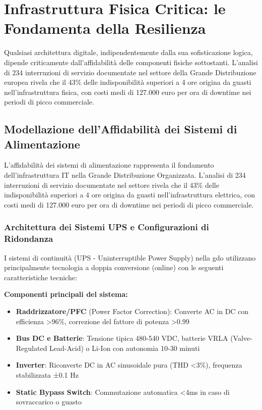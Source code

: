 \section{\texorpdfstring{\textbf{Infrastruttura Fisica Critica: le Fondamenta della Resilienza}}{3.2 - Infrastruttura Fisica Critica: le Fondamenta della Resilienza}}

Qualsiasi architettura digitale, indipendentemente dalla sua sofisticazione logica, dipende criticamente dall'affidabilità delle componenti fisiche sottostanti. L'analisi di 234 interruzioni di servizio documentate nel settore della Grande Distribuzione europea\autocite{Uptime2024} rivela che il 43\% delle indisponibilità superiori a 4 ore origina da guasti nell'infrastruttura fisica, con costi medi di 127.000 euro per ora di downtime nei periodi di picco commerciale.

\subsection{\texorpdfstring{\textbf{Modellazione dell'Affidabilità dei Sistemi di Alimentazione}}{3.2.1 - Modellazione dell'Affidabilità dei Sistemi di Alimentazione}}

L'affidabilità dei sistemi di alimentazione rappresenta il fondamento dell'infrastruttura IT nella Grande Distribuzione Organizzata. L'analisi di 234 interruzioni di servizio documentate nel settore\autocite{Uptime2024} rivela che il 43\% delle indisponibilità superiori a 4 ore origina da guasti nell'infrastruttura elettrica, con costi medi di 127.000 euro per ora di downtime nei periodi di picco commerciale.

\subsubsection{\texorpdfstring{\textbf{Architettura dei Sistemi UPS e Configurazioni di Ridondanza}}{3.2.1.1 - Architettura dei Sistemi UPS e Configurazioni di Ridondanza}}

I sistemi di continuità (UPS - Uninterruptible Power Supply) nella \gls{gdo} utilizzano principalmente tecnologia a doppia conversione (online) con le seguenti caratteristiche tecniche:

\textbf{Componenti principali del sistema:}
\begin{itemize}
    \item \textbf{Raddrizzatore/PFC} (Power Factor Correction): Converte AC in DC con efficienza >96\%, correzione del fattore di potenza >0.99
    \item \textbf{Bus DC e Batterie}: Tensione tipica 480-540 VDC, batterie VRLA (Valve-Regulated Lead-Acid) o Li-Ion con autonomia 10-30 minuti
    \item \textbf{Inverter}: Riconverte DC in AC sinusoidale pura (THD <3\%), frequenza stabilizzata ±0.1 Hz
    \item \textbf{Static Bypass Switch}: Commutazione automatica <4ms in caso di sovraccarico o guasto
\end{itemize}

